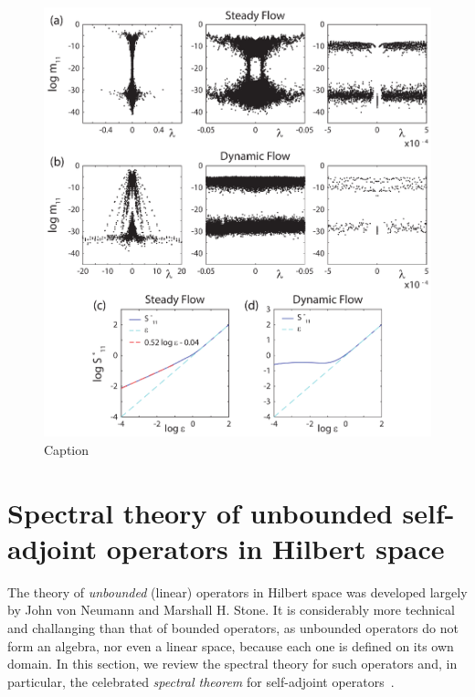 \documentclass[leqno,onefignum,onetabnum]{siamltex1213}
\begin{document}
%
\begin{figure}[t]
  \centerline{\includegraphics[scale=0.75]{Figure1_Spectral_Measures_Effective_Diffusivities.eps}} 
\caption{%
  Caption
        }
\label{fig:Fig1_Spect_Meas_Eff_Diffus}
\end{figure}
%




\appendix
%

\section{Spectral theory of unbounded self-adjoint operators in
  Hilbert space} \label{sec:Spectral_Theory}    
%
The theory of \emph{unbounded} (linear) operators in Hilbert
space was developed largely by John von Neumann and Marshall H. Stone. It
is considerably more technical and challanging than that of bounded
operators, as unbounded operators do not form an algebra, nor even a
linear space, because each one is defined on its own domain. In this
section, we review the spectral theory for such operators and, in
particular, the celebrated \emph{spectral theorem} for self-adjoint
operators~\cite{Reed-1980,Stone:64}.
\end{document}
